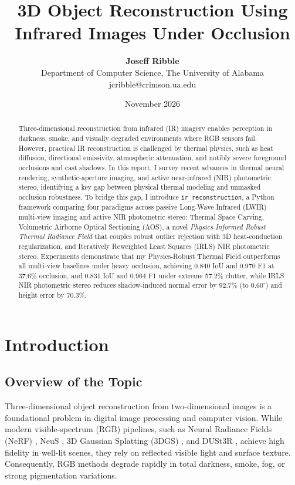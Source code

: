 \documentclass[12pt,letterpaper]{article}
\title{\textbf{3D Object Reconstruction Using Infrared Images Under Occlusion}}
\author{
  \textbf{Joseff Ribble}\\
  Department of Computer Science, The University of Alabama\\
  jcribble@crimson.ua.edu
}
\date{November 2026}
\begin{document}
\maketitle

\begin{abstract}
  \noindent
  Three-dimensional reconstruction from infrared (IR) imagery enables perception in darkness, smoke, and visually degraded environments where RGB sensors fail. However, practical IR reconstruction is challenged by thermal physics, such as heat diffusion, directional emissivity, atmospheric attenuation, and notibly severe foreground occlusions and cast shadows. In this report, I survey recent advances in thermal neural rendering, synthetic-aperture imaging, and active near-infrared (NIR) photometric stereo, identifying a key gap between physical thermal modeling and unmasked occlusion robustness. To bridge this gap, I introduce \texttt{ir\_reconstruction}, a Python framework comparing four paradigms across passive Long-Wave Infrared (LWIR) multi-view imaging and active NIR photometric stereo: Thermal Space Carving, Volumetric Airborne Optical Sectioning (AOS), a novel \emph{Physics-Informed Robust Thermal Radiance Field} that couples robust outlier rejection with 3D heat-conduction regularization, and Iteratively Reweighted Least Squares (IRLS) NIR photometric stereo. Experiments demonstrate that my Physics-Robust Thermal Field outperforms all multi-view baselines under heavy occlusion, achieving 0.840 IoU and 0.970 F1 at 37.6\% occlusion, and 0.831 IoU and 0.964 F1 under extreme 57.2\% clutter, while IRLS NIR photometric stereo reduces shadow-induced normal error by 92.7\% (to $0.60^\circ$) and height error by 70.3\%.
\end{abstract}

\section{Introduction}

\subsection{Overview of the Topic}
Three-dimensional object reconstruction from two-dimensional images is a foundational problem in digital image processing and computer vision. While modern visible-spectrum (RGB) pipelines, such as Neural Radiance Fields (NeRF) \cite{mildenhall2020nerf}, NeuS \cite{wang2021neus}, 3D Gaussian Splatting (3DGS) \cite{kerbl2023gaussians}, and DUSt3R \cite{wang2024dust3r}, achieve high fidelity in well-lit scenes, they rely on reflected visible light and surface texture. Consequently, RGB methods degrade rapidly in total darkness, smoke, fog, or strong pigmentation variations.
\end{document}
